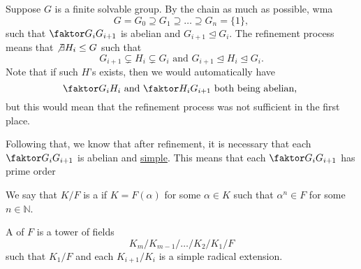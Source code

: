 \documentclass[notoc,notitlepage,nobib]{tufte-book}
\begin{document}
\begin{note}
  Suppose $G$ is a finite solvable group. By  
  the chain as much as possible, wma
  \begin{equation*}
    G = G_0 \supseteq G_1 \supseteq \hdots \supseteq G_n = \{1\},
  \end{equation*}
  such that $\quotient{G_i}{G_{i+1}}$ is abelian and $G_{i+1} \trianglelefteq
  G_i$. The refinement process means that $\not\exists H_i \leq G$ such that
  \begin{equation*}
    G_{i+1} \subsetneq H_i \subsetneq G_i \text{ and } G_{i+1} \trianglelefteq
    H_i \trianglelefteq G_i.
  \end{equation*}
  Note that if such $H$'s exists, then we would automatically have
  \begin{equation*}
    \quotient{G_i}{H_i} \text{ and } \quotient{H_i}{G_{i+1}} \text{ both being
    abelian, }
  \end{equation*}
  but this would mean that the refinement process was not sufficient in the
  first place.

  Following that, we know that after refinement, it is necessary that each
  $\quotient{G_i}{G_{i+1}}$ is abelian and
  \hyperref[defn:simple_extension_and_primitive_elements]{simple}. This means
  that each $\quotient{G_i}{G_{i+1}}$ has prime order 
\end{note}

\begin{defn}\label{defn:simple_radical_extension} 
  We say that $K / F$ is a  if $K = F(\alpha)$ 
  for some $\alpha \in K$ such that $\alpha^n \in F$ for some $n \in
  \mathbb{N}$.
\end{defn}

\begin{defn}\label{defn:radical_tower}
  A  of $F$ is a tower of fields
  \begin{equation}\label{eq:defn_radical_tower}
    K_m / K_{m-1} / \hdots / K_2 / K_1 / F
  \end{equation}
  such that $K_1 / F$ and each $K_{i+1} / K_i$ is a simple radical extension.
\end{defn}
\end{document}
